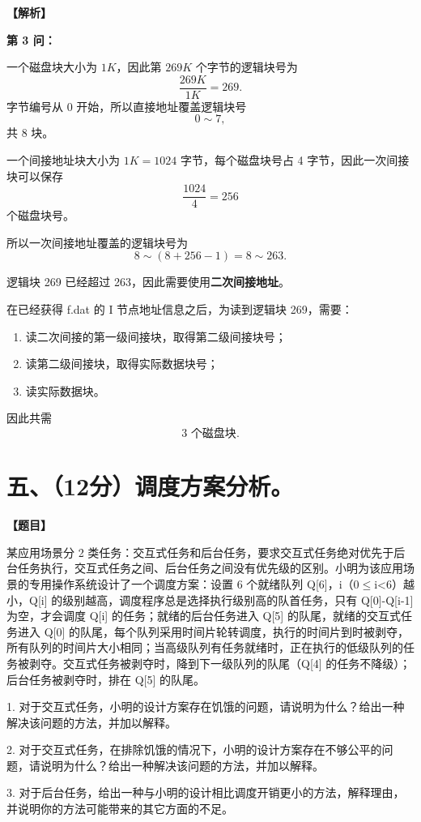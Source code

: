 \documentclass[UTF8,12pt]{ctexart}
\newenvironment{question}{\par\medskip\noindent\textbf{【题目】}\par\smallskip}{\par\medskip}
\newenvironment{explanation}{\par\noindent\textbf{【解析】}\par\smallskip}{\par\medskip}
\begin{document}
\begin{explanation}
\medskip
\textbf{第 3 问：}

一个磁盘块大小为 $1K$，因此第 $269K$ 个字节的逻辑块号为
\[
\frac{269K}{1K}=269.
\]
字节编号从 0 开始，所以直接地址覆盖逻辑块号
\[
0\sim7,
\]
共 8 块。

一个间接地址块大小为 $1K=1024$ 字节，每个磁盘块号占 4 字节，因此一次间接块可以保存
\[
\frac{1024}{4}=256
\]
个磁盘块号。

所以一次间接地址覆盖的逻辑块号为
\[
8\sim(8+256-1)=8\sim263.
\]

逻辑块 269 已经超过 263，因此需要使用\textbf{二次间接地址}。

在已经获得 f.dat 的 I 节点地址信息之后，为读到逻辑块 269，需要：
\begin{enumerate}
  \item 读二次间接的第一级间接块，取得第二级间接块号；
  \item 读第二级间接块，取得实际数据块号；
  \item 读实际数据块。
\end{enumerate}

因此共需
\[
\boxed{3}\text{ 个磁盘块}.
\]
\end{explanation}

\section*{五、（12分）调度方案分析。}

\begin{question}
某应用场景分 2 类任务：交互式任务和后台任务，要求交互式任务绝对优先于后台任务执行，交互式任务之间、后台任务之间没有优先级的区别。小明为该应用场景的专用操作系统设计了一个调度方案：设置 6 个就绪队列 Q[6]，i（0$\leq$i<6）越小，Q[i] 的级别越高，调度程序总是选择执行级别高的队首任务，只有 Q[0]-Q[i-1] 为空，才会调度 Q[i] 的任务；就绪的后台任务进入 Q[5] 的队尾，就绪的交互式任务进入 Q[0] 的队尾，每个队列采用时间片轮转调度，执行的时间片到时被剥夺，所有队列的时间片大小相同；当高级队列有任务就绪时，正在执行的低级队列的任务被剥夺。交互式任务被剥夺时，降到下一级队列的队尾（Q[4] 的任务不降级）；后台任务被剥夺时，排在 Q[5] 的队尾。

1. 对于交互式任务，小明的设计方案存在饥饿的问题，请说明为什么？给出一种解决该问题的方法，并加以解释。

2. 对于交互式任务，在排除饥饿的情况下，小明的设计方案存在不够公平的问题，请说明为什么？给出一种解决该问题的方法，并加以解释。

3. 对于后台任务，给出一种与小明的设计相比调度开销更小的方法，解释理由，并说明你的方法可能带来的其它方面的不足。
\end{question}
\end{document}
